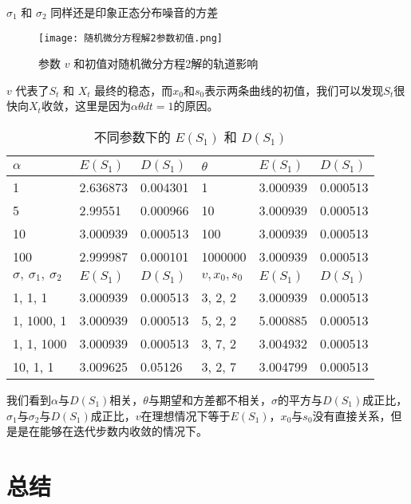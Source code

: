 \documentclass{article}
\begin{document}
$\sigma_1$ 和 $\sigma_2$ 同样还是印象正态分布噪音的方差


\begin{figure}[H]
    \centering
    \texttt{[image: 随机微分方程解2参数初值.png]}
    \caption{参数 $v$ 和初值对随机微分方程2解的轨道影响}
    \label{fig:SDE2_x0}
    \end{figure}

$v$ 代表了$S_t$ 和 $X_t$ 最终的稳态，而$x_0$和$s_0$表示两条曲线的初值，我们可以发现$S_t$很快向$X_t$收敛，这里是因为$\alpha\theta dt = 1$的原因。


\begin{table}[H]
    \centering
    \caption{不同参数下的 $E(S_1)$ 和 $D(S_1)$}
    \begin{tabular}{l|l|l|l|l|l}
    \hline
    $\alpha$                           & $E(S_1)$  & $D(S_1)$  & $\theta$               & $E(S_1)$  & $D(S_1)$  \\ \hline
    1                               & 2.636873 & 0.004301 & 1                   & 3.000939 & 0.000513 \\ 
    5                               & 2.99551  & 0.000966 & 10                  & 3.000939 & 0.000513 \\ 
    10                              & 3.000939 & 0.000513 & 100                 & 3.000939 & 0.000513 \\ 
    100                             & 2.999987 & 0.000101 & 1000000                 & 3.000939 & 0.000513 \\ \hline
    $\sigma,\ \sigma_1,\ \sigma_2$ & $E(S_1)$  & $D(S_1)$  & $v, x_0, s_0$ & $E(S_1)$  & $D(S_1)$  \\ \hline
    1, 1, 1                   & 3.000939 & 0.000513 & 3, 2, 2       & 3.000939 & 0.000513 \\ 
    1, 1000, 1                 & 3.000939 & 0.000513 & 5, 2, 2       & 5.000885 & 0.000513 \\ 
    1, 1, 1000                  & 3.000939 & 0.000513 & 3, 7, 2       & 3.004932 & 0.000513 \\ 
    10, 1, 1                  & 3.009625 & 0.05126  & 3, 2, 7       & 3.004799 & 0.000513 \\ \hline
    \end{tabular}
    \end{table}

我们看到$\alpha$与$D(S_1)$相关，$\theta$与期望和方差都不相关，$\sigma$的平方与$D(S_1)$成正比，$\sigma_1$与$\sigma_2$与$D(S_1)$成正比，$v$在理想情况下等于$E(S_1)$，$x_0$与$s_0$没有直接关系，但是是在能够在迭代步数内收敛的情况下。






\section{总结}







% 
% 
\end{document}
